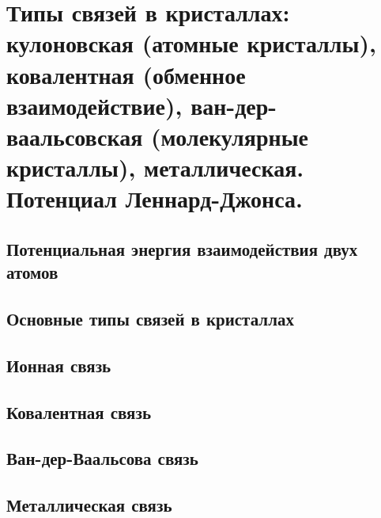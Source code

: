 \section{Типы связей в кристаллах: кулоновская (атомные кристаллы), ковалентная (обменное взаимодействие), ван-дер-ваальсовская (молекулярные кристаллы), металлическая. Потенциал Леннард-Джонса.}

\subsection{Потенциальная энергия взаимодействия двух атомов}
\subsection{Основные типы связей в кристаллах}
\subsection{Ионная связь}
\subsection{Ковалентная связь}
\subsection{Ван-дер-Ваальсова связь}
\subsection{Металлическая связь}


